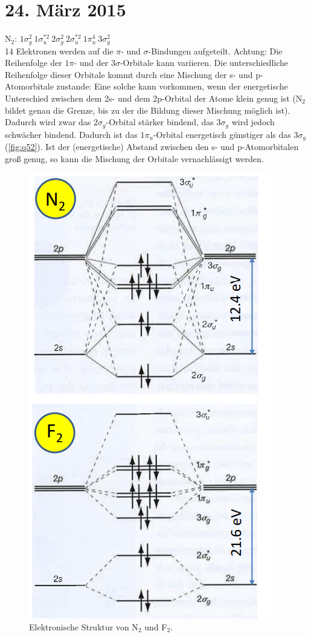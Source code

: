 \section{24. März 2015}

\label{q:51}

\label{q:52}

N$_2$: $1\sigma_g^2 ~ 1\sigma_u^{*2} ~ 2\sigma_g^2 ~ 2\sigma_u^{*2} ~ 1\pi_u^4 ~ 3\sigma_g^2$ \\
14 Elektronen werden auf die $\pi$- und $\sigma$-Bindungen aufgeteilt. Achtung: Die Reihenfolge der $1\pi$- und der $3\sigma$-Orbitale kann variieren. Die unterschiedliche Reihenfolge dieser Orbitale kommt durch eine Mischung der s- und p-Atomorbitale zustande: Eine solche kann vorkommen, wenn der energetische Unterschied zwischen dem 2s- und dem 2p-Orbital der Atome klein genug ist (N$_2$ bildet genau die Grenze, bis zu der die Bildung dieser Mischung möglich ist). Dadurch wird zwar das $2\sigma_g$-Orbital stärker bindend, das $3\sigma_g$ wird jedoch schwächer bindend. Dadurch ist das $1\pi_u$-Orbital energetisch günstiger als das $3\sigma_g$ (\autoref{fig:q52}). Ist der (energetische) Abstand zwischen den s- und p-Atomorbitalen groß genug, so kann die Mischung der Orbitale vernachlässigt werden.

\begin{figure}[H]  
    \centering
    \includegraphics[width=.4\textwidth]{resources/24-03-2015/N2-F2.png}
    \caption{Elektronische Struktur von N$_2$ und F$_2$.}
    \label{fig:q52}
\end{figure}


